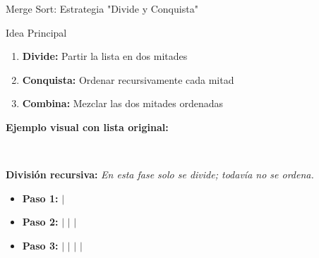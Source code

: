 \documentclass[10pt]{beamer}
\begin{document}
\begin{frame}{Merge Sort: Estrategia "Divide y Conquista"}
  \begin{block}{Idea Principal}
    \begin{enumerate}
      \item \textbf{Divide:} Partir la lista en dos mitades
      \item \textbf{Conquista:} Ordenar recursivamente cada mitad
      \item \textbf{Combina:} Mezclar las dos mitades ordenadas
    \end{enumerate}
  \end{block}
  

  \textbf{Ejemplo visual con lista original:}
  \begin{center}
     \,
     \,
     \,
     \,
  \end{center}
  

	  \textbf{División recursiva:}
	  \textit{En esta fase solo se divide; todavía no se ordena.}
	  \begin{itemize}
	    \item \textbf{Paso 1:} 
	     
	    \quad $|$ \quad
      
    
	    \item \textbf{Paso 2:} 
	    \quad $|$ \quad
	    \quad $|$ \quad
	    \quad $|$ \quad
	     
    
	    \item \textbf{Paso 3:} 
	    \quad $|$ \quad
	    \quad $|$ \quad
	    \quad $|$ \quad
	    \quad $|$ \quad
  \end{itemize}

\end{frame}
\end{document}

